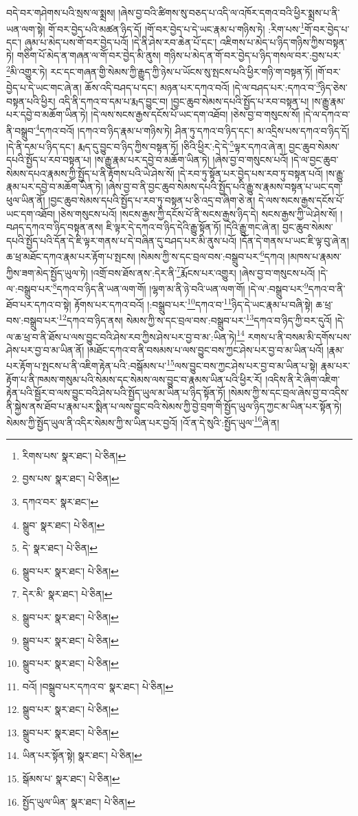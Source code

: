 བདེ་བར་གཤེགས་པའི་སྲས་ལ་སྨྲས། །ཞེས་བྱ་བའི་ཚིགས་སུ་བཅད་པ་འདི་ལ་འཁོར་དགའ་བའི་ཕྱིར་སྨྲས་པ་ནི་ཡན་ལག་སྟེ། གོ་བར་བྱེད་པའི་མཚན་ཉིད་དོ། །གོ་བར་བྱེད་པ་དེ་ཡང་རྣམ་པ་གཉིས་ཏེ། :རིག་པས་\footnote{རིགས་པས་  སྣར་ཐང་།  པེ་ཅིན། }གོ་བར་བྱེད་པ་དང་། ཞུམ་པ་མེད་པས་གོ་བར་བྱེད་པའོ། །དེ་ནི་ཤེས་རབ་ཆེན་པོ་དང་། འཇིགས་པ་མེད་པ་ཉིད་གཉིས་ཀྱིས་བསྟན་ཏེ། གཅིག་པོ་མེད་ན་གཞན་ལ་གོ་བར་བྱེད་མི་ནུས། གཉིས་པ་མེད་ན་གོ་བར་བྱེད་པ་ཉིད་གསལ་བར་:བྱས་པར་\footnote{བྱས་པས་  སྣར་ཐང་།  པེ་ཅིན། }མི་འགྱུར་ཏེ། རང་དང་གཞན་གྱི་སེམས་ཀྱི་རྒྱུད་ཀྱི་ཉེས་པ་ཡོངས་སུ་སྤངས་པའི་ཕྱིར་གཉི་ག་བསྟན་ཏོ། །གོ་བར་བྱེད་པ་དེ་ཡང་གང་ཞེ་ན། ཆོས་འདི་བཤད་པ་དང་། མཉན་པར་དཀའ་བའོ། །དེ་ལ་བཤད་པར་:དཀའ་བ་\footnote{དཀའ་བར་  སྣར་ཐང་། }ཉིད་ཅེས་བསྟན་པའི་ཕྱིར། འདི་ནི་དཀའ་བ་དམ་པ་རྨད་བྱུང་བ། །བྱང་ཆུབ་སེམས་དཔའི་སྤྱོད་པ་རབ་བསྟན་པ། །ས་རྒྱུ་རྣམ་པར་དབྱེ་བ་མཆོག་ཡིན་ཏེ། །དེ་ལས་སངས་རྒྱས་དངོས་པོ་ཡང་དག་འཐོབ། །ཅེས་བྱ་བ་གསུངས་སོ། །དེ་ལ་དཀའ་བ་ནི་བསྒྲུབ་\footnote{སྒྲུབ་  སྣར་ཐང་།  པེ་ཅིན། }དཀའ་བའོ། །དཀའ་བ་ཉིད་རྣམ་པ་གཉིས་ཏེ། ཤིན་ཏུ་དཀའ་བ་ཉིད་དང་། མ་འདྲིས་པས་དཀའ་བ་ཉིད་དོ། །དེ་ནི་དམ་པ་ཉིད་དང་། རྨད་དུ་བྱུང་བ་ཉིད་ཀྱིས་བསྟན་ཏོ། །ཅིའི་ཕྱིར་:དེ་དེ་\footnote{དེ་  སྣར་ཐང་།  པེ་ཅིན། }ལྟར་དཀའ་ཞེ་ན། བྱང་ཆུབ་སེམས་དཔའི་སྤྱོད་པ་རབ་བསྟན་པ། །ས་རྒྱུ་རྣམ་པར་དབྱེ་བ་མཆོག་ཡིན་ཏེ། །ཞེས་བྱ་བ་གསུངས་པའོ། །དེ་ལ་བྱང་ཆུབ་སེམས་དཔའ་རྣམས་ཀྱི་སྤྱོད་པ་ནི་རྟོགས་པའི་ཡེ་ཤེས་སོ། །དེ་རབ་ཏུ་སྟོན་པར་བྱེད་པས་རབ་ཏུ་བསྟན་པའོ། །ས་རྒྱུ་རྣམ་པར་དབྱེ་བ་མཆོག་ཡིན་ཏེ། །ཞེས་བྱ་བ་ནི་བྱང་ཆུབ་སེམས་དཔའི་སྤྱོད་པའི་རྒྱུ་ས་རྣམས་བསྟན་པ་ཡང་དག་ཕུལ་ཡིན་ནོ། །བྱང་ཆུབ་སེམས་དཔའི་སྤྱོད་པ་རབ་ཏུ་བསྟན་པ་ཅི་འདྲ་བ་ཞིག་ཅེ་ན། དེ་ལས་སངས་རྒྱས་དངོས་པོ་ཡང་དག་འཐོབ། །ཅེས་གསུངས་པའོ། །སངས་རྒྱས་ཀྱི་དངོས་པོ་ནི་སངས་རྒྱས་ཉིད་དེ། སངས་རྒྱས་ཀྱི་ཡེ་ཤེས་སོ། །བཤད་དཀའ་བ་ཉིད་བསྟན་ནས། ཇི་ལྟར་དེ་དཀའ་བ་ཉིད་དེའི་རྒྱུ་སྟོན་ཏོ། །དེའི་རྒྱུ་གང་ཞེ་ན། བྱང་ཆུབ་སེམས་དཔའི་སྤྱོད་པའི་དོན་དེ་ཇི་ལྟར་གནས་པ་དེ་བཞིན་དུ་བཤད་པར་མི་ནུས་པའོ། །དོན་དེ་གནས་པ་ཡང་ཇི་ལྟ་བུ་ཞེ་ན། ཆ་ཕྲ་མཐོང་དཀའ་རྣམ་པར་རྟོག་པ་སྤངས། །སེམས་ཀྱི་ས་དང་བྲལ་བས་:བསྒྲུབ་པར་\footnote{སྒྲུབ་པར་  སྣར་ཐང་།  པེ་ཅིན། }དཀའ། །མཁས་པ་རྣམས་ཀྱིས་ཟག་མེད་སྤྱོད་ཡུལ་ཏེ། །འགྲོ་བས་ཐོས་ནས་:དེར་ནི་\footnote{དེར་མི་  སྣར་ཐང་།  པེ་ཅིན། }རྨོངས་པར་འགྱུར། །ཞེས་བྱ་བ་གསུངས་པའོ། །དེ་ལ་:བསྒྲུབ་པར་\footnote{སྒྲུབ་པར་  སྣར་ཐང་།  པེ་ཅིན། }དཀའ་བ་ཉིད་ནི་ཡན་ལག་གོ། །ལྷག་མ་ནི་ཉེ་བའི་ཡན་ལག་གོ། །དེ་ལ་:བསྒྲུབ་པར་\footnote{སྒྲུབ་པར་  སྣར་ཐང་།  པེ་ཅིན། }དཀའ་བ་ནི་ཐོབ་པར་དཀའ་བ་སྟེ། རྟོགས་པར་དཀའ་བའོ། །:བསྒྲུབ་པར་\footnote{སྒྲུབ་པར་  སྣར་ཐང་།  པེ་ཅིན། }དཀའ་བ་\footnote{བའོ། །བསྒྲུབ་པར་དཀའ་བ་  སྣར་ཐང་།  པེ་ཅིན། }ཉིད་དེ་ཡང་རྣམ་པ་བཞི་སྟེ། ཆ་ཕྲ་བས་:བསྒྲུབ་པར་\footnote{སྒྲུབ་པར་  སྣར་ཐང་།  པེ་ཅིན། }དཀའ་བ་ཉིད་ནས། སེམས་ཀྱི་ས་དང་བྲལ་བས་:བསྒྲུབ་པར་\footnote{སྒྲུབ་པར་  སྣར་ཐང་།  པེ་ཅིན། }དཀའ་བ་ཉིད་ཀྱི་བར་དུའོ། །དེ་ལ་ཆ་ཕྲ་བ་ནི་ཐོས་པ་ལས་བྱུང་བའི་ཤེས་རབ་ཀྱིས་ཤེས་པར་བྱ་བ་མ་:ཡིན་ཏེ།\footnote{ཡིན་པར་སྟོན་སྟེ།  སྣར་ཐང་།  པེ་ཅིན། } རགས་པ་ནི་བསམ་མི་དགོས་པས་ཤེས་པར་བྱ་བ་མ་ཡིན་ནོ། །མཐོང་དཀའ་བ་ནི་བསམས་པ་ལས་བྱུང་བས་ཀྱང་ཤེས་པར་བྱ་བ་མ་ཡིན་པའོ། །རྣམ་པར་རྟོག་པ་སྤངས་པ་ནི་འཇིག་རྟེན་པའི་:བསྒོམས་པ་\footnote{སྒོམས་པ་  སྣར་ཐང་།  པེ་ཅིན། }ལས་བྱུང་བས་ཀྱང་ཤེས་པར་བྱ་བ་མ་ཡིན་པ་སྟེ། རྣམ་པར་རྟོག་པ་ནི་ཁམས་གསུམ་པའི་སེམས་དང་སེམས་ལས་བྱུང་བ་རྣམས་ཡིན་པའི་ཕྱིར་རོ། །འདིས་ནི་རེ་ཞིག་འཇིག་རྟེན་པའི་སྦྱོར་བ་ལས་བྱུང་བའི་ཤེས་པའི་སྤྱོད་ཡུལ་མ་ཡིན་པ་ཉིད་སྟོན་ཏོ། །སེམས་ཀྱི་ས་དང་བྲལ་ཞེས་བྱ་བ་འདིས་ནི་སྐྱེས་ནས་ཐོབ་པ་རྣམ་པར་སྨིན་པ་ལས་བྱུང་བའི་སེམས་ཀྱི་བྱེ་བྲག་གི་སྤྱོད་ཡུལ་ཉིད་ཀྱང་མ་ཡིན་པར་སྟོན་ཏེ། སེམས་ཀྱི་སྤྱོད་ཡུལ་ནི་འདིར་སེམས་ཀྱི་ས་ཡིན་པར་བྱའོ། །འོ་ན་དེ་སུའི་:སྤྱོད་ཡུལ་\footnote{སྤྱོད་ཡུལ་ཡིན་  སྣར་ཐང་།  པེ་ཅིན། }ཞེ་ན། 